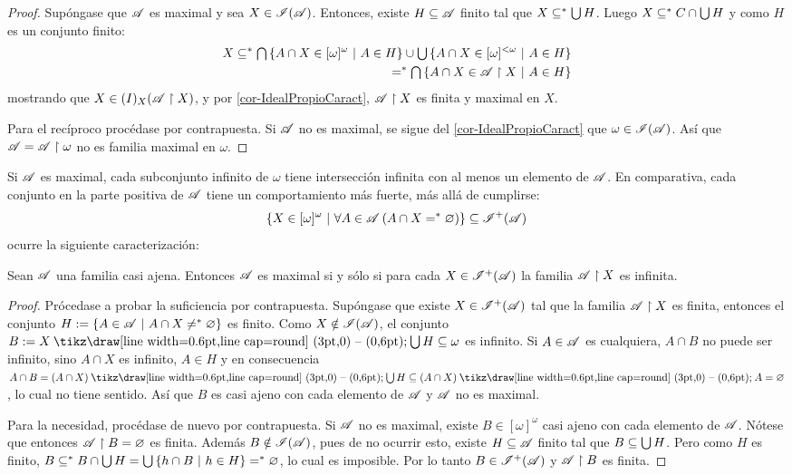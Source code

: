 \begin{proof}
	Supóngase que $\mathscr{A}$ es maximal y sea $X \in \mathscr{I}(\mathscr{A})$. Entonces, existe $H \subseteq \mathscr{A}$ finito tal que $X \subseteq^* \mbox{$\bigcup$}\, H$. Luego $X \subseteq^* C \cap \mbox{$\bigcup$}\, H$ y como $H$ es un conjunto finito:
	\begin{align*}
		X \subseteq^* \mbox{$\bigcap$}\,\{ A \cap X \in [\omega]^\omega \text{ $|$ } A \in H \} \cup \mbox{$\bigcup$}\,\{ A \cap X \in [\omega]^{<\omega} \text{ $|$ } A \in H \} \\
		=^* \mbox{$\bigcap$}\,\{ A \cap X \in \mathscr{A} \upharpoonright X \text{ $|$ } A \in H \}
	\end{align*}
	mostrando que $X \in \mathscr{(}I)_X(\mathscr{A}\upharpoonright X)$, y por \ref{cor-IdealPropioCaract}, $\mathscr{A} \upharpoonright X$ es finita y maximal en $X$.

	Para el recíproco procédase por contrapuesta. Si $\mathscr{A}$ no es maximal, se sigue del \autoref{cor-IdealPropioCaract} que $\omega \in \mathscr{I}(\mathscr{A})$. Así que $\mathscr{A} = \mathscr{A} \upharpoonright \omega$ no es familia maximal en $\omega$.
\end{proof}

Si $\mathscr{A}$ es maximal, cada subconjunto infinito de $\omega$ tiene intersección infinita con al menos un elemento de $\mathscr{A}$. En comparativa, cada conjunto en la parte positiva de $\mathscr{A}$ tiene un comportamiento más fuerte, más allá de cumplirse:
\[ \{X \in [\omega]^{\omega} \text{ $|$ } \forall A \in \mathscr{A} \: (A \cap X =^* \varnothing) \} \subseteq \mathscr{I}^+(\mathscr{A}) \]
ocurre la siguiente caracterización:

\begin{proposicion}\label{prop-CaracMADPositiv}
	Sean $\mathscr{A}$ una familia casi ajena. Entonces $\mathscr{A}$ es maximal si y sólo si para cada $X \in \mathscr{I}^+(\mathscr{A})$ la familia $\mathscr{A} \upharpoonright X$ es infinita.
\end{proposicion}

\begin{proof}
	Prócedase a probar la suficiencia por contrapuesta. Supóngase que existe $X \in \mathscr{I}^+(\mathscr{A})$ tal que la familia $\mathscr{A} \upharpoonright X$ es finita, entonces el conjunto $H:=\{ A \in \mathscr{A} \text{ $|$ } A \cap X \neq^* \varnothing \}$ es finito. Como $X \notin \mathscr{I}(\mathscr{A})$, el conjunto $B:=X \setminus \midcup H \subseteq \omega$ es infinito. Si $A \in \mathscr{A}$ es cualquiera, $A \cap B$ no puede ser infinito, sino $A \cap X$ es infinito, $A \in H$ y en consecuencia $A \cap B = (A \cap X) \setminus \midcup H \subseteq (A \cap X) \setminus A = \emptyset$, lo cual no tiene sentido. Así que $B$ es casi ajeno con cada elemento de $\mathscr{A}$ y $\mathscr{A}$ no es maximal.

	Para la necesidad, procédase de nuevo por contrapuesta. Si $\mathscr{A}$ no es maximal, existe $B \in [\omega]^\omega$ casi ajeno con cada elemento de $\mathscr{A}$. Nótese que entonces $\mathscr{A} \upharpoonright B = \varnothing$ es finita. Además $B \notin \mathscr{I}(\mathscr{A})$, pues de no ocurrir esto, existe $H \subseteq \mathscr{A}$ finito tal que $B \subseteq \mbox{$\bigcup$}\, H$. Pero como $H$ es finito, $B \subseteq^* B \cap \mbox{$\bigcup$}\, H = \mbox{$\bigcup$}\, \{ h \cap B \text{ $|$ } h \in H \} =^* \varnothing$, lo cual es imposible. Por lo tanto $B \in \mathscr{I}^+(\mathscr{A})$ y $\mathscr{A} \upharpoonright B$ es finita.
\end{proof}


